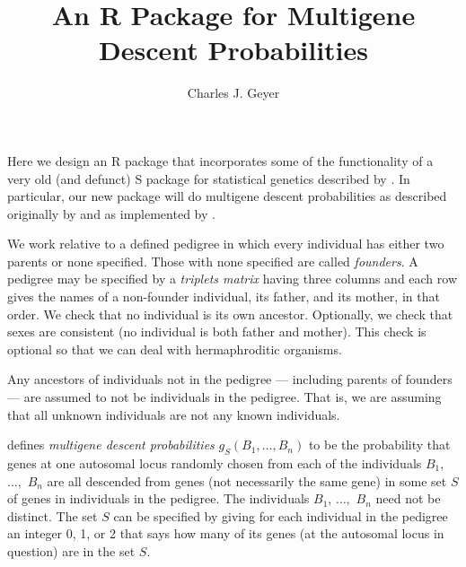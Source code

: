 \documentclass[11pt]{article}
\begin{document}
\title{An R Package for Multigene Descent Probabilities}

\author{Charles J. Geyer}

\maketitle

Here we design an R package that incorporates some of the functionality
of a very old (and defunct) S package for statistical genetics described
by \citet{geyer}.  In particular, our new package will do multigene
descent probabilities as described originally by \citet{thompson} and
as implemented by \citet{geyer}.

We work relative to a defined pedigree in which every individual has either
two parents or none specified.  Those with none specified are called
\emph{founders}.  A pedigree may be specified by a \emph{triplets matrix}
having three columns and each row gives the names of a non-founder individual,
its father, and its mother, in that order.  We check that no individual is
its own ancestor.  Optionally, we check that sexes are consistent
(no individual is both father and mother).  This check is optional
so that we can deal with hermaphroditic organisms.

Any ancestors of individuals not in the pedigree --- including parents
of founders --- are assumed to not be individuals in the pedigree.
That is, we are assuming that all unknown individuals are not any known
individuals.

\citet{thompson} defines \emph{multigene descent probabilities}
$g_S(B_1, \ldots, B_n)$ to be the probability that genes
at one autosomal locus randomly chosen from
each of the individuals $B_1$, $\ldots,$ $B_n$
are all descended from genes (not necessarily the same gene)
in some set $S$ of genes in individuals in the pedigree.
The individuals $B_1$, $\ldots,$ $B_n$ need not be distinct.
The set $S$ can be specified by giving for each individual in the pedigree
an integer 0, 1, or 2 that says how many of its genes (at the autosomal locus
in question) are in the set $S$.
\end{document}

